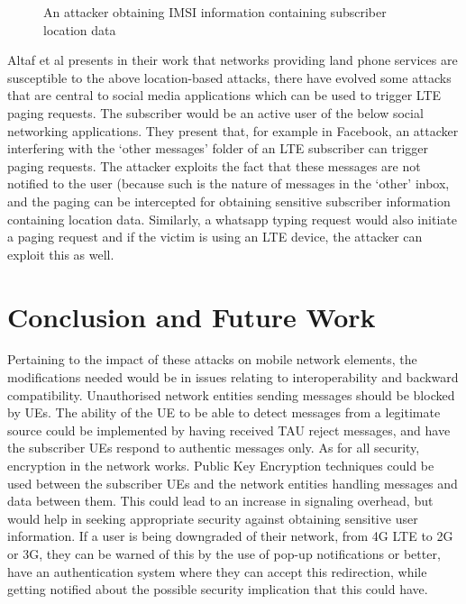 \documentclass[sigconf,nonacm]{acmart}
\begin{document}
\begin{figure}
    \centering
    \caption{An attacker obtaining IMSI information containing subscriber location data \cite{teen}}
    \label{fig:my_label}
\end{figure}
Altaf et al \cite{che} presents in their work that networks providing land phone services are susceptible to the above location-based attacks, there have evolved some attacks that are central to social media applications which can be used to trigger LTE paging requests. The subscriber would be an active user of the below social networking applications. They present that, for example in Facebook, an attacker interfering with the ‘other messages’ folder of an LTE subscriber can trigger paging requests. The attacker exploits the fact that these messages are not notified to the user (because such is the nature of messages in the ‘other’ inbox, and the paging can be intercepted for obtaining sensitive subscriber information containing location data. Similarly, a whatsapp typing request would also initiate a paging request and if the victim is using an LTE device, the attacker can exploit this as well. 

\section{Conclusion and Future Work}

Pertaining to the impact of these attacks on mobile network elements, the modifications needed would be in issues relating to interoperability and backward compatibility. Unauthorised network entities sending messages should be blocked by UEs. The ability of the UE to be able to detect messages from a legitimate source could be implemented by having received TAU reject messages, and have the subscriber UEs respond to authentic messages only. As for all security, encryption in the network works. Public Key Encryption techniques could be used between the subscriber UEs and the network entities handling messages and data between them. This could lead to an increase in signaling overhead, but would help in seeking appropriate security against obtaining sensitive user information. 
If a user is being downgraded of their network, from 4G LTE to 2G or 3G, they can be warned of this by the use of pop-up notifications or better, have an authentication system where they can accept this redirection, while getting notified about the possible security implication that this could have.
\end{document}
